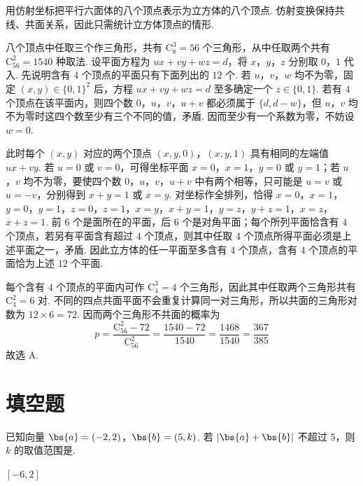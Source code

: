 \begin{solution}
用仿射坐标把平行六面体的八个顶点表示为立方体的八个顶点. 仿射变换保持共线、共面关系，因此只需统计立方体顶点的情形.

八个顶点中任取三个作三角形，共有 \(\mathrm C_8^3=56\) 个三角形，从中任取两个共有 \(\mathrm C_{56}^2=1540\) 种取法. 设平面方程为 \(ux+vy+wz=d\)，将 \(x\)，\(y\)，\(z\) 分别取 \(0\)，\(1\) 代入. 先说明含有 \(4\) 个顶点的平面只有下面列出的 \(12\) 个. 若 \(u\)，\(v\)，\(w\) 均不为零，固定 \((x,y)\in\{0,1\}^2\) 后，方程 \(ux+vy+wz=d\) 至多确定一个 \(z\in\{0,1\}\). 若有 \(4\) 个顶点在该平面内，则四个数 \(0\)，\(u\)，\(v\)，\(u+v\) 都必须属于 \(\{d,d-w\}\)，但 \(u\)，\(v\) 均不为零时这四个数至少有三个不同的值，矛盾. 因而至少有一个系数为零，不妨设 \(w=0\).

此时每个 \((x,y)\) 对应的两个顶点 \((x,y,0)\)，\((x,y,1)\) 具有相同的左端值 \(ux+vy\). 若 \(u=0\) 或 \(v=0\)，可得坐标平面 \(x=0\)，\(x=1\)，\(y=0\) 或 \(y=1\)；若 \(u\)，\(v\) 均不为零，要使四个数 \(0\)，\(u\)，\(v\)，\(u+v\) 中有两个相等，只可能是 \(u=v\) 或 \(u=-v\)，分别得到 \(x+y=1\) 或 \(x=y\). 对坐标作全排列，恰得
\(x=0\)，\(x=1\)，\(y=0\)，\(y=1\)，\(z=0\)，\(z=1\)，\(x=y\)，\(x+y=1\)，\(y=z\)，\(y+z=1\)，\(x=z\)，\(x+z=1\).
前 \(6\) 个是面所在的平面，后 \(6\) 个是对角平面；每个所列平面恰含有 \(4\) 个顶点，若另有平面含有超过 \(4\) 个顶点，则其中任取 \(4\) 个顶点所得平面必须是上述平面之一，矛盾. 因此立方体的任一平面至多含有 \(4\) 个顶点，含有 \(4\) 个顶点的平面恰为上述 \(12\) 个平面.

每个含有 \(4\) 个顶点的平面内可作 \(\mathrm C_4^3=4\) 个三角形，因此其中任取两个三角形共有 \(\mathrm C_4^2=6\) 对. 不同的四点共面平面不会重复计算同一对三角形，所以共面的三角形对数为 \(12\times6=72\). 因而两个三角形不共面的概率为
\[
p=\frac{\mathrm C_{56}^2-72}{\mathrm C_{56}^2}=\frac{1540-72}{1540}=\frac{1468}{1540}=\frac{367}{385}
\]
故选 A.
\end{solution}

\section{填空题}
\begin{problem}
已知向量 \(\bs{a} = (-2, 2)\)，\(\bs{b} = (5, k)\). 若 \(|\bs{a} + \bs{b}|\) 不超过 \(5\)，则 \(k\) 的取值范围是\fillinblank{}.
\end{problem}

\begin{answer}
\([-6,2]\)
\end{answer}

